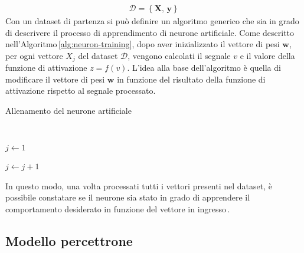 % 
\begin{gather*}
    \mathcal{D} = \left\{ \mathbf{X},\, \mathbf{y} \right\}  
\end{gather*}
% 
Con un dataset di partenza si può definire un algoritmo generico che sia in grado di descrivere il processo di apprendimento di neurone artificiale. Come descritto nell'Algoritmo\,\ref{alg:neuron-training}, dopo aver inizializzato il vettore di pesi $\mathbf{w}$, per ogni vettore $X_j$ del dataset $\mathcal{D}$, vengono calcolati il segnale $v$ e il valore della funzione di attivazione $z = f(v)$. L'idea alla base dell'algoritmo è quella di modificare il vettore di pesi $\mathbf{w}$ in funzione del risultato della funzione di attivazione rispetto al segnale processato.
% 
\begin{algorithm}[ht]
    \caption{Allenamento del neurone artificiale}\label{alg:neuron-training}
    \begin{algorithmic}
        \STATE\,

        \STATE$j \gets 1$
        
            \STATE{}
            \STATE{}
            \STATE{}
            \STATE$j \gets j + 1$
        \ENDWHILE\,
    \end{algorithmic}
\end{algorithm}
% 
\noindent In questo modo, una volta processati tutti i vettori presenti nel dataset, è possibile constatare se il neurone sia stato in grado di apprendere il comportamento desiderato in funzione del vettore in ingresso\,\cite{flasinski2016introduction}.

\subsection{Modello percettrone}

